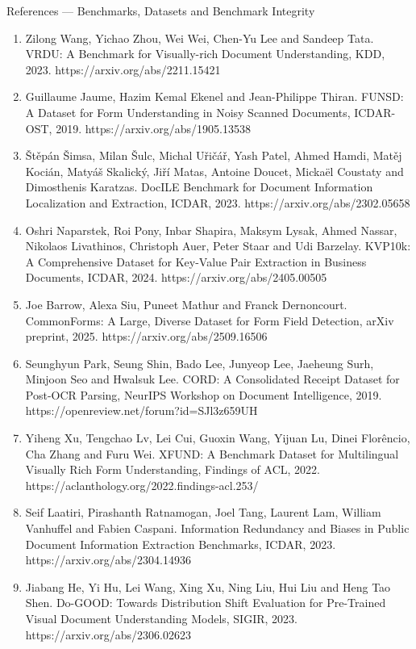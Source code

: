 \documentclass[aspectratio=169, 11pt]{beamer}
\newcommand{\reffont}{\fontsize{4.6}{5.2}\selectfont}
\begin{document}
\begin{frame}{References — Benchmarks, Datasets and Benchmark Integrity}
  \reffont
  {\setlength{\itemsep}{0pt}\setlength{\topsep}{1pt}\setlength{\parsep}{0pt}
  \begin{enumerate}
    \item Zilong Wang, Yichao Zhou, Wei Wei, Chen-Yu Lee and Sandeep Tata. VRDU: A Benchmark for Visually-rich Document Understanding, KDD, 2023. https://arxiv.org/abs/2211.15421
    \item Guillaume Jaume, Hazim Kemal Ekenel and Jean-Philippe Thiran. FUNSD: A Dataset for Form Understanding in Noisy Scanned Documents, ICDAR-OST, 2019. https://arxiv.org/abs/1905.13538
    \item Štěpán Šimsa, Milan Šulc, Michal Uřičář, Yash Patel, Ahmed Hamdi, Matěj Kocián, Matyáš Skalický, Jiří Matas, Antoine Doucet, Mickaël Coustaty and Dimosthenis Karatzas. DocILE Benchmark for Document Information Localization and Extraction, ICDAR, 2023. https://arxiv.org/abs/2302.05658
    \item Oshri Naparstek, Roi Pony, Inbar Shapira, Maksym Lysak, Ahmed Nassar, Nikolaos Livathinos, Christoph Auer, Peter Staar and Udi Barzelay. KVP10k: A Comprehensive Dataset for Key-Value Pair Extraction in Business Documents, ICDAR, 2024. https://arxiv.org/abs/2405.00505
    \item Joe Barrow, Alexa Siu, Puneet Mathur and Franck Dernoncourt. CommonForms: A Large, Diverse Dataset for Form Field Detection, arXiv preprint, 2025. https://arxiv.org/abs/2509.16506
    \item Seunghyun Park, Seung Shin, Bado Lee, Junyeop Lee, Jaeheung Surh, Minjoon Seo and Hwalsuk Lee. CORD: A Consolidated Receipt Dataset for Post-OCR Parsing, NeurIPS Workshop on Document Intelligence, 2019. https://openreview.net/forum?id=SJl3z659UH
    \item Yiheng Xu, Tengchao Lv, Lei Cui, Guoxin Wang, Yijuan Lu, Dinei Florêncio, Cha Zhang and Furu Wei. XFUND: A Benchmark Dataset for Multilingual Visually Rich Form Understanding, Findings of ACL, 2022. https://aclanthology.org/2022.findings-acl.253/
    \item Seif Laatiri, Pirashanth Ratnamogan, Joel Tang, Laurent Lam, William Vanhuffel and Fabien Caspani. Information Redundancy and Biases in Public Document Information Extraction Benchmarks, ICDAR, 2023. https://arxiv.org/abs/2304.14936
    \item Jiabang He, Yi Hu, Lei Wang, Xing Xu, Ning Liu, Hui Liu and Heng Tao Shen. Do-GOOD: Towards Distribution Shift Evaluation for Pre-Trained Visual Document Understanding Models, SIGIR, 2023. https://arxiv.org/abs/2306.02623

\end{enumerate}}
\end{frame}
\end{document}
